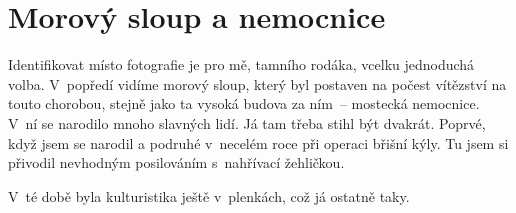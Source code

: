 
\chapter{Morový sloup a nemocnice}

Identifikovat místo fotografie je pro mě, tamního rodáka, vcelku jednoduchá
volba. V~popředí vidíme morový sloup, který byl postaven na počest vítězství na
touto chorobou, stejně jako ta vysoká budova za ním~-- mostecká nemocnice. V~ní
se narodilo mnoho slavných lidí. Já tam třeba stihl být dvakrát. Poprvé, když
jsem se narodil a podruhé v~necelém roce při operaci břišní kýly. Tu jsem si
přivodil nevhodným posilováním s~nahřívací žehličkou.

V~té době byla kulturistika ještě v~plenkách, což já ostatně taky.


